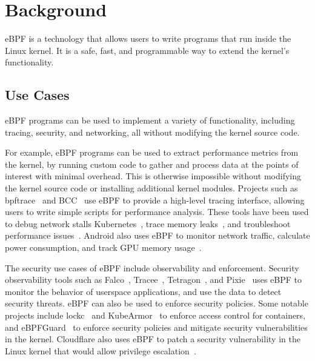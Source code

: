 \section{Background}
\label{sec:background}


eBPF is a technology that allows users to write programs that run inside the Linux kernel.
It is a safe, fast, and programmable way to extend the kernel's functionality.


\subsection{Use Cases}

eBPF programs can be used to implement a variety of functionality,
including tracing, security, and networking, all without modifying the kernel source code.

For example, eBPF programs can be used to extract performance metrics from the kernel,
by running custom code to gather and process data at the points of interest with minimal overhead.
This is otherwise impossible without modifying the kernel source code or installing additional kernel modules.
Projects such as bpftrace~\cite{bpftrace} and BCC~\cite{bcc} use eBPF to provide a high-level tracing interface,
allowing users to write simple scripts for performance analysis.
These tools have been used to
debug network stalls Kubernetes~\cite{github-k8s-debug},
trace memory leaks~\cite{ebpf-real-debugging},
and troubleshoot performance issues~\cite{ebpf-real-debugging}.
Android also uses eBPF to monitor network traffic, calculate power consumption, and track GPU memory usage~\cite{android-ebpf}.

The security use cases of eBPF include observability and enforcement.
Security observability tools such as Falco~\cite{falco}, Tracee~\cite{tracee}, Tetragon~\cite{tetragon}, and Pixie~\cite{pixie}
uses eBPF to monitor the behavior of userspace applications, and use the data to detect security threats.
eBPF can also be used to enforce security policies.
Some notable projects include lockc~\cite{lockc} and KubeArmor~\cite{kubearmor} to enforce access control for containers,
and eBPFGuard~\cite{ebpfguard,ebpfguard2} to enforce security policies and mitigate security vulnerabilities in the kernel.
Cloudflare also uses eBPF to patch a security vulnerability in the Linux kernel that would allow privilege escalation~\cite{cloudflare-ebpf}.

